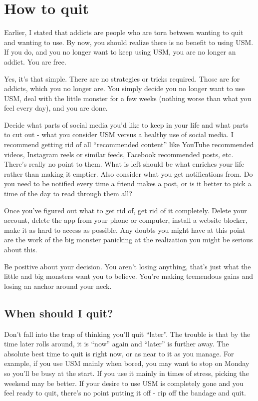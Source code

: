 \documentclass[
]{book}
\begin{document}
\chapter{How to quit}\label{how-to-quit}

Earlier, I stated that addicts are people who are torn between wanting to quit and wanting to use. By now, you should realize there is no benefit to using USM. If you do, and you no longer want to keep using USM, you are no longer an addict. You are free.

Yes, it's that simple. There are no strategies or tricks required. Those are for addicts, which you no longer are. You simply decide you no longer want to use USM, deal with the little monster for a few weeks (nothing worse than what you feel every day), and you are done.

Decide what parts of social media you'd like to keep in your life and what parts to cut out - what you consider USM versus a healthy use of social media. I recommend getting rid of all ``recommended content'' like YouTube recommended videos, Instagram reels or similar feeds, Facebook recommended posts, etc. There's really no point to them. What is left should be what enriches your life rather than making it emptier. Also consider what you get notifications from. Do you need to be notified every time a friend makes a post, or is it better to pick a time of the day to read through them all?

Once you've figured out what to get rid of, get rid of it completely. Delete your account, delete the app from your phone or computer, install a website blocker, make it as hard to access as possible. Any doubts you might have at this point are the work of the big monster panicking at the realization you might be serious about this.

Be positive about your decision. You aren't losing anything, that's just what the little and big monsters want you to believe. You're making tremendous gains and losing an anchor around your neck.

\section{When should I quit?}\label{when-should-i-quit}

Don't fall into the trap of thinking you'll quit ``later''. The trouble is that by the time later rolls around, it is ``now'' again and ``later'' is further away. The absolute best time to quit is right now, or as near to it as you manage. For example, if you use USM mainly when bored, you may want to stop on Monday so you'll be busy at the start. If you use it mainly in times of stress, picking the weekend may be better. If your desire to use USM is completely gone and you feel ready to quit, there's no point putting it off - rip off the bandage and quit.
\end{document}
